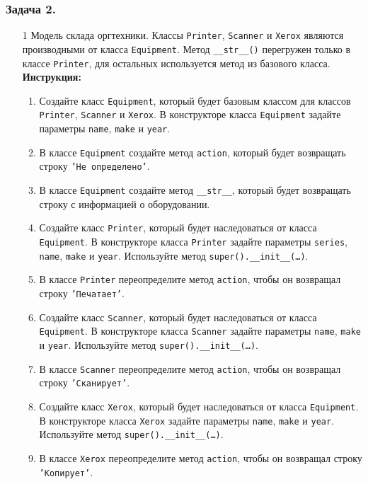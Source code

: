 \subsubsection{Задача 2.} 
\begin{enumerate}
\item[1]
Модель склада оргтехники. Классы \texttt{Printer}, \texttt{Scanner} и \texttt{Xerox} являются производными от класса \texttt{Equipment}. Метод \texttt{\_\_str\_\_()} перегружен только в классе \texttt{Printer}, для остальных используется метод из базового класса.
\textbf{Инструкция:}
\begin{enumerate}
    \item Создайте класс \texttt{Equipment}, который будет базовым классом для классов \texttt{Printer}, \texttt{Scanner} и \texttt{Xerox}. В конструкторе класса \texttt{Equipment} задайте параметры \texttt{name}, \texttt{make} и \texttt{year}.
    \item В классе \texttt{Equipment} создайте метод \texttt{action}, который будет возвращать строку \texttt{'Не определено'}.
    \item В классе \texttt{Equipment} создайте метод \texttt{\_\_str\_\_}, который будет возвращать строку с информацией о оборудовании.
    \item Создайте класс \texttt{Printer}, который будет наследоваться от класса \texttt{Equipment}. В конструкторе класса \texttt{Printer} задайте параметры \texttt{series}, \texttt{name}, \texttt{make} и \texttt{year}. Используйте метод \texttt{super().\_\_init\_\_(\ldots)}.
    \item В классе \texttt{Printer} переопределите метод \texttt{action}, чтобы он возвращал строку \texttt{'Печатает'}.
    \item Создайте класс \texttt{Scanner}, который будет наследоваться от класса \texttt{Equipment}. В конструкторе класса \texttt{Scanner} задайте параметры \texttt{name}, \texttt{make} и \texttt{year}. Используйте метод \texttt{super().\_\_init\_\_(\ldots)}.
    \item В классе \texttt{Scanner} переопределите метод \texttt{action}, чтобы он возвращал строку \texttt{'Сканирует'}.
    \item Создайте класс \texttt{Xerox}, который будет наследоваться от класса \texttt{Equipment}. В конструкторе класса \texttt{Xerox} задайте параметры \texttt{name}, \texttt{make} и \texttt{year}. Используйте метод \texttt{super().\_\_init\_\_(\ldots)}.
    \item В классе \texttt{Xerox} переопределите метод \texttt{action}, чтобы он возвращал строку \texttt{'Копирует'}.

\end{enumerate}
\end{enumerate}
